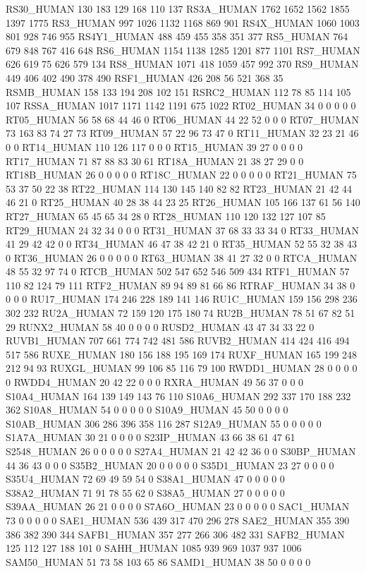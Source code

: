 RS30_HUMAN	130	183	129	168	110	137
RS3A_HUMAN	1762	1652	1562	1855	1397	1775
RS3_HUMAN	997	1026	1132	1168	869	901
RS4X_HUMAN	1060	1003	801	928	746	955
RS4Y1_HUMAN	488	459	455	358	351	377
RS5_HUMAN	764	679	848	767	416	648
RS6_HUMAN	1154	1138	1285	1201	877	1101
RS7_HUMAN	626	619	75	626	579	134
RS8_HUMAN	1071	418	1059	457	992	370
RS9_HUMAN	449	406	402	490	378	490
RSF1_HUMAN	426	208	56	521	368	35
RSMB_HUMAN	158	133	194	208	102	151
RSRC2_HUMAN	112	78	85	114	105	107
RSSA_HUMAN	1017	1171	1142	1191	675	1022
RT02_HUMAN	34	0	0	0	0	0
RT05_HUMAN	56	58	68	44	46	0
RT06_HUMAN	44	22	52	0	0	0
RT07_HUMAN	73	163	83	74	27	73
RT09_HUMAN	57	22	96	73	47	0
RT11_HUMAN	32	23	21	46	0	0
RT14_HUMAN	110	126	117	0	0	0
RT15_HUMAN	39	27	0	0	0	0
RT17_HUMAN	71	87	88	83	30	61
RT18A_HUMAN	21	38	27	29	0	0
RT18B_HUMAN	26	0	0	0	0	0
RT18C_HUMAN	22	0	0	0	0	0
RT21_HUMAN	75	53	37	50	22	38
RT22_HUMAN	114	130	145	140	82	82
RT23_HUMAN	21	42	44	46	21	0
RT25_HUMAN	40	28	38	44	23	25
RT26_HUMAN	105	166	137	61	56	140
RT27_HUMAN	65	45	65	34	28	0
RT28_HUMAN	110	120	132	127	107	85
RT29_HUMAN	24	32	34	0	0	0
RT31_HUMAN	37	68	33	33	34	0
RT33_HUMAN	41	29	42	42	0	0
RT34_HUMAN	46	47	38	42	21	0
RT35_HUMAN	52	55	32	38	43	0
RT36_HUMAN	26	0	0	0	0	0
RT63_HUMAN	38	41	27	32	0	0
RTCA_HUMAN	48	55	32	97	74	0
RTCB_HUMAN	502	547	652	546	509	434
RTF1_HUMAN	57	110	82	124	79	111
RTF2_HUMAN	89	94	89	81	66	86
RTRAF_HUMAN	34	38	0	0	0	0
RU17_HUMAN	174	246	228	189	141	146
RU1C_HUMAN	159	156	298	236	302	232
RU2A_HUMAN	72	159	120	175	180	74
RU2B_HUMAN	78	51	67	82	51	29
RUNX2_HUMAN	58	40	0	0	0	0
RUSD2_HUMAN	43	47	34	33	22	0
RUVB1_HUMAN	707	661	774	742	481	586
RUVB2_HUMAN	414	424	416	494	517	586
RUXE_HUMAN	180	156	188	195	169	174
RUXF_HUMAN	165	199	248	212	94	93
RUXGL_HUMAN	99	106	85	116	79	100
RWDD1_HUMAN	28	0	0	0	0	0
RWDD4_HUMAN	20	42	22	0	0	0
RXRA_HUMAN	49	56	37	0	0	0
S10A4_HUMAN	164	139	149	143	76	110
S10A6_HUMAN	292	337	170	188	232	362
S10A8_HUMAN	54	0	0	0	0	0
S10A9_HUMAN	45	50	0	0	0	0
S10AB_HUMAN	306	286	396	358	116	287
S12A9_HUMAN	55	0	0	0	0	0
S1A7A_HUMAN	30	21	0	0	0	0
S23IP_HUMAN	43	66	38	61	47	61
S2548_HUMAN	26	0	0	0	0	0
S27A4_HUMAN	21	42	42	36	0	0
S30BP_HUMAN	44	36	43	0	0	0
S35B2_HUMAN	20	0	0	0	0	0
S35D1_HUMAN	23	27	0	0	0	0
S35U4_HUMAN	72	69	49	59	54	0
S38A1_HUMAN	47	0	0	0	0	0
S38A2_HUMAN	71	91	78	55	62	0
S38A5_HUMAN	27	0	0	0	0	0
S39AA_HUMAN	26	21	0	0	0	0
S7A6O_HUMAN	23	0	0	0	0	0
SAC1_HUMAN	73	0	0	0	0	0
SAE1_HUMAN	536	439	317	470	296	278
SAE2_HUMAN	355	390	386	382	390	344
SAFB1_HUMAN	357	277	266	306	482	331
SAFB2_HUMAN	125	112	127	188	101	0
SAHH_HUMAN	1085	939	969	1037	937	1006
SAM50_HUMAN	51	73	58	103	65	86
SAMD1_HUMAN	38	50	0	0	0	0

